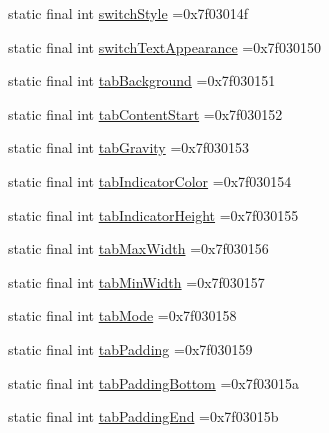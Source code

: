 \begin{DoxyCompactItemize}
static final int \mbox{\hyperlink{classbr_1_1unb_1_1cic_1_1mp_1_1marketmaster_1_1test_1_1R_1_1attr_a87c45b61ce9828bc375aef4849c2c6a9}{switch\+Style}} =0x7f03014f
\item 
static final int \mbox{\hyperlink{classbr_1_1unb_1_1cic_1_1mp_1_1marketmaster_1_1test_1_1R_1_1attr_aa026b72a2fc37fc9aa961679fdcf5a4e}{switch\+Text\+Appearance}} =0x7f030150
\item 
static final int \mbox{\hyperlink{classbr_1_1unb_1_1cic_1_1mp_1_1marketmaster_1_1test_1_1R_1_1attr_ad47f37562ab47270f7f8b998252b33d0}{tab\+Background}} =0x7f030151
\item 
static final int \mbox{\hyperlink{classbr_1_1unb_1_1cic_1_1mp_1_1marketmaster_1_1test_1_1R_1_1attr_a3e2eeeab659204bdf4c12115a03c9fc3}{tab\+Content\+Start}} =0x7f030152
\item 
static final int \mbox{\hyperlink{classbr_1_1unb_1_1cic_1_1mp_1_1marketmaster_1_1test_1_1R_1_1attr_a58a4316f57b1df7e70f9642cc1acc752}{tab\+Gravity}} =0x7f030153
\item 
static final int \mbox{\hyperlink{classbr_1_1unb_1_1cic_1_1mp_1_1marketmaster_1_1test_1_1R_1_1attr_a490b9772cc6b09618c6ababd0f756695}{tab\+Indicator\+Color}} =0x7f030154
\item 
static final int \mbox{\hyperlink{classbr_1_1unb_1_1cic_1_1mp_1_1marketmaster_1_1test_1_1R_1_1attr_a5d531a4d1b0cd7a0a09473aaee612517}{tab\+Indicator\+Height}} =0x7f030155
\item 
static final int \mbox{\hyperlink{classbr_1_1unb_1_1cic_1_1mp_1_1marketmaster_1_1test_1_1R_1_1attr_a370e35a4934a47ad3fb4a7894411221b}{tab\+Max\+Width}} =0x7f030156
\item 
static final int \mbox{\hyperlink{classbr_1_1unb_1_1cic_1_1mp_1_1marketmaster_1_1test_1_1R_1_1attr_a5c2088c2460327052b0c84866e6f29ab}{tab\+Min\+Width}} =0x7f030157
\item 
static final int \mbox{\hyperlink{classbr_1_1unb_1_1cic_1_1mp_1_1marketmaster_1_1test_1_1R_1_1attr_a2b7ba65d728c31c286bb0921e9a2aa1e}{tab\+Mode}} =0x7f030158
\item 
static final int \mbox{\hyperlink{classbr_1_1unb_1_1cic_1_1mp_1_1marketmaster_1_1test_1_1R_1_1attr_a591d0667d3293869120d21fae5a88c8f}{tab\+Padding}} =0x7f030159
\item 
static final int \mbox{\hyperlink{classbr_1_1unb_1_1cic_1_1mp_1_1marketmaster_1_1test_1_1R_1_1attr_ac1aa4e0fed552a4aee00d17e410a6829}{tab\+Padding\+Bottom}} =0x7f03015a
\item 
static final int \mbox{\hyperlink{classbr_1_1unb_1_1cic_1_1mp_1_1marketmaster_1_1test_1_1R_1_1attr_aaef9cca4dbdcb580ce7227e59b5d3ce3}{tab\+Padding\+End}} =0x7f03015b

\end{DoxyCompactItemize}
